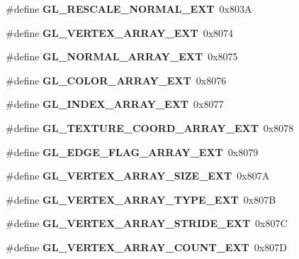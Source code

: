 \begin{DoxyCompactItemize}
\item 
\#define {\bfseries G\+L\+\_\+\+R\+E\+S\+C\+A\+L\+E\+\_\+\+N\+O\+R\+M\+A\+L\+\_\+\+E\+X\+T}~0x803\+A\label{_s_d_l__opengl_8h_ac2001da5ac3fa43af22c7ff338ebca26}

\item 
\#define {\bfseries G\+L\+\_\+\+V\+E\+R\+T\+E\+X\+\_\+\+A\+R\+R\+A\+Y\+\_\+\+E\+X\+T}~0x8074\label{_s_d_l__opengl_8h_a603e034055a458b4916623c096f26960}

\item 
\#define {\bfseries G\+L\+\_\+\+N\+O\+R\+M\+A\+L\+\_\+\+A\+R\+R\+A\+Y\+\_\+\+E\+X\+T}~0x8075\label{_s_d_l__opengl_8h_abc658a2f91bfb6c203bb52a2cff75839}

\item 
\#define {\bfseries G\+L\+\_\+\+C\+O\+L\+O\+R\+\_\+\+A\+R\+R\+A\+Y\+\_\+\+E\+X\+T}~0x8076\label{_s_d_l__opengl_8h_acef31c990755e5735c51cddb326341c5}

\item 
\#define {\bfseries G\+L\+\_\+\+I\+N\+D\+E\+X\+\_\+\+A\+R\+R\+A\+Y\+\_\+\+E\+X\+T}~0x8077\label{_s_d_l__opengl_8h_a44c06b225b7d8130be69560be3a59fd5}

\item 
\#define {\bfseries G\+L\+\_\+\+T\+E\+X\+T\+U\+R\+E\+\_\+\+C\+O\+O\+R\+D\+\_\+\+A\+R\+R\+A\+Y\+\_\+\+E\+X\+T}~0x8078\label{_s_d_l__opengl_8h_a1a0bb3b3f8a3a01cb0773014052edfa2}

\item 
\#define {\bfseries G\+L\+\_\+\+E\+D\+G\+E\+\_\+\+F\+L\+A\+G\+\_\+\+A\+R\+R\+A\+Y\+\_\+\+E\+X\+T}~0x8079\label{_s_d_l__opengl_8h_a4444cf3102bcf14257bc2610e20e4826}

\item 
\#define {\bfseries G\+L\+\_\+\+V\+E\+R\+T\+E\+X\+\_\+\+A\+R\+R\+A\+Y\+\_\+\+S\+I\+Z\+E\+\_\+\+E\+X\+T}~0x807\+A\label{_s_d_l__opengl_8h_a2d157b984cd5304d016430a028f52f32}

\item 
\#define {\bfseries G\+L\+\_\+\+V\+E\+R\+T\+E\+X\+\_\+\+A\+R\+R\+A\+Y\+\_\+\+T\+Y\+P\+E\+\_\+\+E\+X\+T}~0x807\+B\label{_s_d_l__opengl_8h_ad33f940bd8cb0e14b9e3c058a788c109}

\item 
\#define {\bfseries G\+L\+\_\+\+V\+E\+R\+T\+E\+X\+\_\+\+A\+R\+R\+A\+Y\+\_\+\+S\+T\+R\+I\+D\+E\+\_\+\+E\+X\+T}~0x807\+C\label{_s_d_l__opengl_8h_add069b4723b79d4807c6a0c5321ef25e}

\item 
\#define {\bfseries G\+L\+\_\+\+V\+E\+R\+T\+E\+X\+\_\+\+A\+R\+R\+A\+Y\+\_\+\+C\+O\+U\+N\+T\+\_\+\+E\+X\+T}~0x807\+D\label{_s_d_l__opengl_8h_a69bca0f4a2384c6c510bfe3237df7f39}


\end{DoxyCompactItemize}
